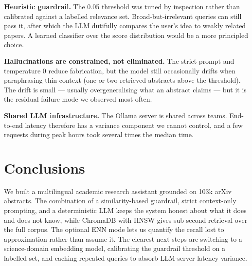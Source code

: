 \documentclass[conference]{IEEEtran}
\begin{document}
\textbf{Heuristic guardrail.} The 0.05 threshold was tuned by inspection rather than calibrated against a labelled relevance set. Broad-but-irrelevant queries can still pass it, after which the LLM dutifully compares the user's idea to weakly related papers. A learned classifier over the score distribution would be a more principled choice.

\textbf{Hallucinations are constrained, not eliminated.} The strict prompt and temperature 0 reduce fabrication, but the model still occasionally drifts when paraphrasing thin context (one or two retrieved abstracts above the threshold). The drift is small --- usually overgeneralising what an abstract claims --- but it is the residual failure mode we observed most often.

\textbf{Shared LLM infrastructure.} The Ollama server is shared across teams. End-to-end latency therefore has a variance component we cannot control, and a few requests during peak hours took several times the median time.

\section{Conclusions}

We built a multilingual academic research assistant grounded on 103k arXiv abstracts. The combination of a similarity-based guardrail, strict context-only prompting, and a deterministic LLM keeps the system honest about what it does and does not know, while ChromaDB with HNSW gives sub-second retrieval over the full corpus. The optional ENN mode lets us quantify the recall lost to approximation rather than assume it. The clearest next steps are switching to a science-domain embedding model, calibrating the guardrail threshold on a labelled set, and caching repeated queries to absorb LLM-server latency variance.
\end{document}
